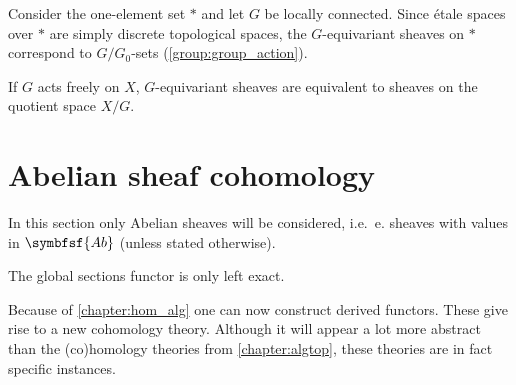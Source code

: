 
    \begin{example}[$G$-sets]
        Consider the one-element set $\ast$ and let $G$ be locally connected. Since \'etale spaces over $\ast$ are simply discrete topological spaces, the $G$-equivariant sheaves on $\ast$ correspond to $G/G_0$-sets (\cref{group:group_action}).
    \end{example}

    \begin{example}
        If $G$ acts freely on $X$, $G$-equivariant sheaves are equivalent to sheaves on the quotient space $X/G$.
    \end{example}

\section{Abelian sheaf cohomology}

    In this section only Abelian sheaves will be considered, i.e.~e. sheaves with values in $\symbfsf{Ab}$ (unless stated otherwise).

    \begin{property}\label{sheaf:left_exact_functor}
        The global sections functor is only left exact.
    \end{property}

    Because of \cref{chapter:hom_alg} one can now construct derived functors. These give rise to a new cohomology theory. Although it will appear a lot more abstract than the (co)homology theories from \cref{chapter:algtop}, these theories are in fact specific instances.

